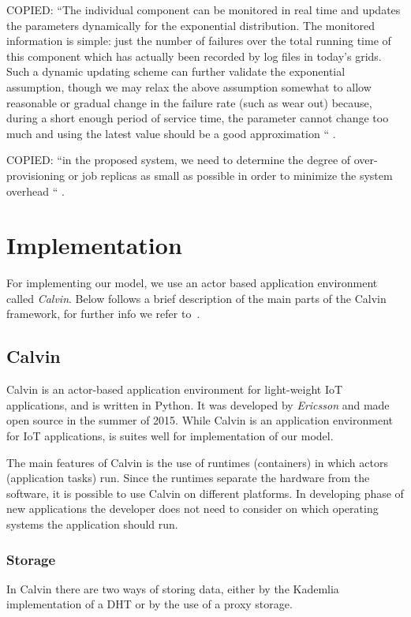 \documentclass{cslthse-msc}
\begin{document}
COPIED:
“The individual component can be monitored in real time and updates the parameters dynamically for the exponential distribution. The monitored information is simple: just the number of failures over the total running time of this component which has actually been recorded by log files in today’s grids. Such a dynamic updating scheme can further validate the exponential assumption, though we may relax the above assumption somewhat to allow reasonable or gradual change in the failure rate (such as wear out) because, during a short enough period of service time, the parameter cannot change too much and using the latest value should be a good approximation “ \cite{hierarchicalRelModeling}.

COPIED: “in the proposed system, we need to determine the degree of over-provisioning or job replicas as small as possible in order to minimize the system overhead “ \cite{designFaultTolerantSched}.
\fi

\section{Implementation} \label{sec:design_implementation}
For implementing our model, we use an actor based application environment called \emph{Calvin}. Below follows a brief description of the main parts of the Calvin framework, for further info we refer to~\cite{calvin}.

\subsection{Calvin} \label{subsec:design_calvin}
Calvin is an actor-based application environment for light-weight IoT applications, and is written in Python. It was developed by \emph{Ericsson} and made open source in the summer of 2015. While Calvin is an application environment for IoT applications, is suites well for implementation of our model.

The main features of Calvin is the use of runtimes (containers) in which actors (application tasks) run. Since the runtimes separate the hardware from the software, it is possible to use Calvin on different platforms. In developing phase of new applications the developer does not need to consider on which operating systems the application should run.

\subsubsection{Storage} \label{sec:calvin_storage}
In Calvin there are two ways of storing data, either by the Kademlia implementation of a DHT or by the use of a proxy storage.
\end{document}
